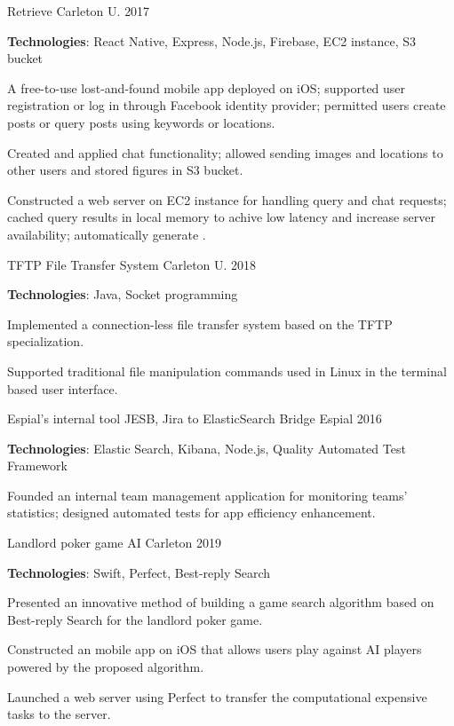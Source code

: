 \begin{cventries}

\cventry
{\textnormal{}}
{Retrieve}
{Carleton U.}
{2017}
{\begin{cvitems}
    \item {\textbf{Technologies}: React Native, Express, Node.js, Firebase, EC2 instance, S3 bucket}
    \item {A free-to-use lost-and-found mobile app deployed on iOS; supported user registration or log in through Facebook identity provider; permitted users create posts or query posts using keywords or locations.}
    \item {Created and applied chat functionality; allowed sending images and locations to other users and stored figures in S3 bucket.}
    \item {Constructed a web server on EC2 instance for handling query and chat requests; cached query results in local memory to achive low latency and increase server availability; automatically generate .}
\end{cvitems}}

\cventry
{\textnormal{}}
{TFTP File Transfer System}
{Carleton U.}
{2018}
{\begin{cvitems}
    \item {\textbf{Technologies}: Java, Socket programming}
    \item {Implemented a connection-less file transfer system based on the TFTP specialization.}
    \item {Supported traditional file manipulation commands used in Linux in the terminal based user interface.}
\end{cvitems}}

\cventry
{\textnormal{Espial's internal tool}}
{JESB, Jira to ElasticSearch Bridge}
{Espial}
{2016}
{\begin{cvitems}
    \item {\textbf{Technologies}: Elastic Search, Kibana, Node.js, Quality Automated Test Framework}
    \item {Founded an internal team management application for monitoring teams' statistics; designed automated tests for app efficiency enhancement.}
\end{cvitems}}

\cventry
{\textnormal{}}
{Landlord poker game AI}
{Carleton}
{2019}
{\begin{cvitems}
    \item {\textbf{Technologies}: Swift, Perfect, Best-reply Search}
    \item {Presented an innovative method of building a game search algorithm based on Best-reply Search for the landlord poker game.}
    \item {Constructed an mobile app on iOS that allows users play against AI players powered by the proposed algorithm.}
    \item {Launched a web server using Perfect to transfer the computational expensive tasks to the server.}
\end{cvitems}}


\end{cventries}
